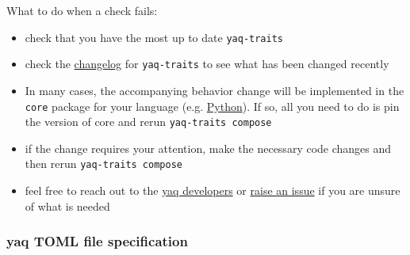 
What to do when a check fails:

\begin{itemize}
\tightlist
\item
  check that you have the most up to date \texttt{yaq-traits}
\item
  check the
  \href{https://github.com/yaq-project/yaq-traits/blob/main/CHANGELOG.md}{changelog}
  for \texttt{yaq-traits} to see what has been changed recently
\item
  In many cases, the accompanying behavior change will be implemented in
  the \texttt{core} package for your language (e.g.
  \href{https://github.com/yaq-project/yaq-python/blob/main/yaqd-core/CHANGELOG.md}{Python}).
  If so, all you need to do is pin the version of core and rerun
  \texttt{yaq-traits\ compose}
\item
  if the change requires your attention, make the necessary code changes
  and then rerun \texttt{yaq-traits\ compose}
\item
  feel free to reach out to the \href{https://yaq.fyi/contact/}{yaq
  developers} or
  \href{https://github.com/yaq-project/yaq-traits/issues}{raise an
  issue} if you are unsure of what is needed
\end{itemize}

\hypertarget{yaq-toml-file-specification}{%
\subsubsection{yaq TOML file
specification}\label{yaq-toml-file-specification}}


